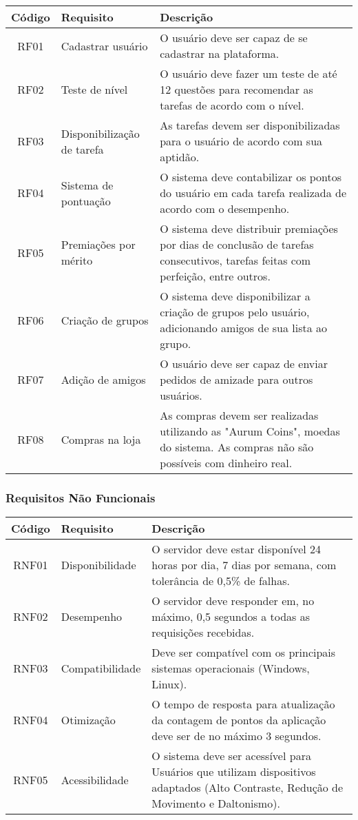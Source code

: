 \documentclass[
	article,			%
	12pt,				%
	oneside,			%
	a4paper,			%
	english,			%
	brazil,				%
	sumario=tradicional
	]{abntex2}
\begin{document}
\begin{center}
\begin{tabular}{|c|l|p{6cm}|}
\hline
\textbf{Código} & \textbf{Requisito} & \textbf{Descrição} \\
\hline
RF01 & Cadastrar usuário & O usuário deve ser capaz de se cadastrar na plataforma.\\
\hline
RF02 & Teste de nível & O usuário deve fazer um teste de até 12 questões para recomendar as tarefas de acordo com o nível.\\
\hline
RF03 & Disponibilização de tarefa & As tarefas devem ser disponibilizadas para o usuário de acordo com sua aptidão. \\
\hline
RF04 & Sistema de pontuação & O sistema deve contabilizar os pontos do usuário em cada tarefa realizada de acordo com o desempenho. \\
\hline
RF05 & Premiações por mérito & O sistema deve distribuir premiações por dias de conclusão de tarefas consecutivos, tarefas feitas com perfeição, entre outros. \\
\hline
RF06 & Criação de grupos & O sistema deve disponibilizar a criação de grupos pelo usuário, adicionando amigos de sua lista ao grupo. \\
\hline
RF07 & Adição de amigos & O usuário deve ser capaz de enviar pedidos de amizade para outros usuários. \\
\hline
RF08 & Compras na loja & As compras devem ser realizadas utilizando as "Aurum Coins", moedas do sistema. As compras não são possíveis com dinheiro real. \\
\hline
\end{tabular}
\end{center}


\subsubsection{Requisitos Não Funcionais}

\begin{center}
\vspace{-0.0cm}

\begin{tabular}{|c|l|p{8cm}|}
\hline
\textbf{Código} & \textbf{Requisito} & \textbf{Descrição} \\
\hline
RNF01 & Disponibilidade & O servidor deve estar disponível 24 horas por dia, 7 dias por semana, com tolerância de 0,5\% de falhas. \\
\hline
RNF02 & Desempenho & O servidor deve responder em, no máximo, 0,5 segundos a todas as requisições recebidas. \\
\hline
RNF03 & Compatibilidade & Deve ser compatível com os principais sistemas operacionais (Windows, Linux). \\
\hline
RNF04 & Otimização & O tempo de resposta para atualização da contagem de pontos da aplicação deve ser de no máximo 3 segundos. \\
\hline
RNF05 & Acessibilidade & O sistema deve ser acessível para Usuários que utilizam dispositivos adaptados (Alto Contraste, Redução de Movimento e Daltonismo). \\
\hline
\end{tabular}
\end{center}
\end{document}
